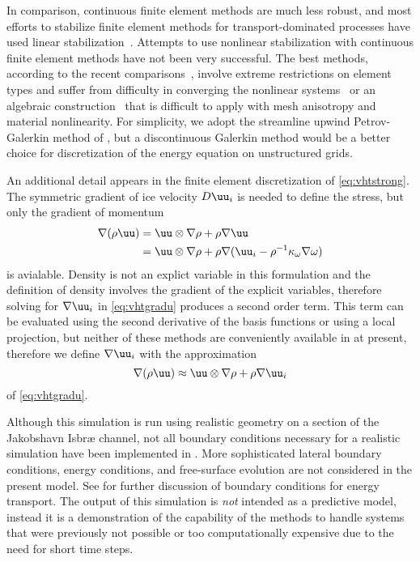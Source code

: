 In comparison, continuous finite element methods are much less robust, and most efforts to stabilize finite element methods for transport-dominated processes have used linear stabilization~\citep{brooks1982sup,hughes1989new,hughes1998variational,matthies2008stabilization}.
Attempts to use nonlinear stabilization with continuous finite element methods have not been very successful.
The best methods, according to the recent comparisons~\citep{john2007spurious,john2008spurious,john2008femtimecdr}, involve extreme restrictions on element types and suffer from difficulty in converging the nonlinear systems~\citep{mizukami1985petrov} or an algebraic construction~\citep{kuzmin2004high} that is difficult to apply with mesh anisotropy and material nonlinearity.
For simplicity, we adopt the streamline upwind Petrov-Galerkin method of \citep{brooks1982sup}, but a discontinuous Galerkin method would be a better choice for discretization of the energy equation on unstructured grids.

An additional detail appears in the finite element discretization of \eqref{eq:vhtstrong}.
The symmetric gradient of ice velocity $D\uu_i$ is needed to define the stress, but only the gradient of momentum
\begin{equation}\label{eq:vhtgradu}
  \begin{split}
    \nabla(\rho\uu) &= \uu \otimes \nabla\rho + \rho \nabla\uu \\
    &= \uu \otimes \nabla\rho + \rho \nabla (\uu_i - \rho^{-1} \kappa_\omega\nabla \omega)
  \end{split}
\end{equation}
is avialable.
Density is not an explict variable in this formulation and the definition of density involves the gradient of the explicit variables, therefore solving for $\nabla\uu_i$ in \eqref{eq:vhtgradu} produces a second order term.
This term can be evaluated using the second derivative of the basis functions or using a local projection, but neither of these methods are conveniently available in {\Dohp} at present, therefore we define $\nabla\uu_i$ with the approximation
\begin{equation*}
  \nabla(\rho\uu) \approx \uu \otimes \nabla\rho + \rho \nabla \uu_i
\end{equation*}
of \eqref{eq:vhtgradu}.

Although this simulation is run using realistic geometry on a section of the Jakobshavn Isbr{\ae} channel, not all boundary conditions necessary for a realistic simulation have been implemented in {\Dohp}.
More sophisticated lateral boundary conditions, energy conditions, and free-surface evolution are not considered in the present model.
See \citet{aschwanden2011enthalpy} for further discussion of boundary conditions for energy transport.
The output of this simulation is \emph{not} intended as a predictive model, instead it is a demonstration of the capability of the methods to handle systems that were previously not possible or too computationally expensive due to the need for short time steps.
